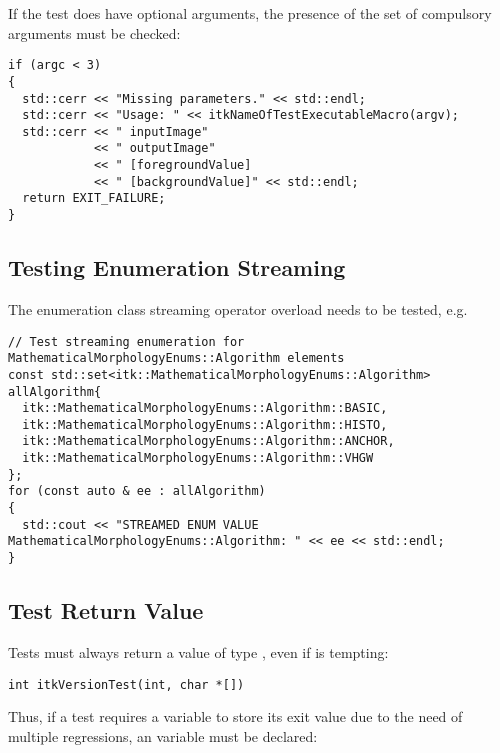 If the test does have optional arguments, the presence of the set of compulsory
arguments must be checked:

\small
\begin{verbatim}
if (argc < 3)
{
  std::cerr << "Missing parameters." << std::endl;
  std::cerr << "Usage: " << itkNameOfTestExecutableMacro(argv);
  std::cerr << " inputImage"
            << " outputImage"
            << " [foregroundValue]
            << " [backgroundValue]" << std::endl;
  return EXIT_FAILURE;
}
\end{verbatim}
\normalsize


\subsection{Testing Enumeration Streaming}
\label{subsec:TestEnumStreaming}

The enumeration class streaming operator overload needs to be tested, e.g.
\small
\begin{verbatim}
// Test streaming enumeration for MathematicalMorphologyEnums::Algorithm elements
const std::set<itk::MathematicalMorphologyEnums::Algorithm> allAlgorithm{
  itk::MathematicalMorphologyEnums::Algorithm::BASIC,
  itk::MathematicalMorphologyEnums::Algorithm::HISTO,
  itk::MathematicalMorphologyEnums::Algorithm::ANCHOR,
  itk::MathematicalMorphologyEnums::Algorithm::VHGW
};
for (const auto & ee : allAlgorithm)
{
  std::cout << "STREAMED ENUM VALUE MathematicalMorphologyEnums::Algorithm: " << ee << std::endl;
}
\end{verbatim}
\normalsize


\subsection{Test Return Value}
\label{subsec:TestReturnValue}

Tests must always return a value of type ,
even if  is tempting:

\small
\begin{verbatim}
int itkVersionTest(int, char *[])
\end{verbatim}
\normalsize

Thus, if a test requires a variable to store its exit value due to the need
of multiple regressions, an  variable must be declared:

